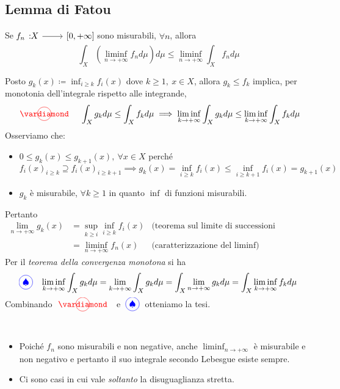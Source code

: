 \subsection{Lemma di Fatou}
\begin{lemming}
	Se $\funz{f_n}{X}{\left[0,+\infty\right]}$ sono misurabili, $\forall n$, allora
	\begin{equation}
		\int_X\left(\liminf_{n\to+\infty}f_nd\mu\right)d\mu\leq \liminf_{n\to+\infty}\int_Xf_nd\mu
	\end{equation}
\end{lemming}
\begin{demonstration}
	Posto $\displaystyle g_k(x)\coloneqq\inf_{i\geq k}f_i(x)$ dove $k\geq 1,\ x\in X$, allora $g_k\leq f_k$ implica, per monotonia dell'integrale rispetto alle integrande,
	\begin{equation*}
		\circled[red]{\vardiamond}\quad\int_Xg_kd\mu\leq \int_Xf_kd\mu\implies \liminf_{k\to+\infty}\int_Xg_kd\mu\leq \liminf_{k\to+\infty}\int_Xf_kd\mu
	\end{equation*}
Osserviamo che:
\begin{itemize}
	\item $0\leq g_k(x)\leq g_{k+1}(x),\ \forall x\in X$ perché
	\begin{equation*}
		f_i(x)_{i\geq k}\supseteq f_i(x)_{i\geq k+1}\implies g_k(x)=\inf_{i\geq k}f_i(x)\leq\inf_{i\geq k+1}f_i(x)=g_{k+1}(x)
	\end{equation*}
	\item $g_k$ è misurabile, $\forall k\geq 1$ in quanto $\inf$ di funzioni misurabili.
\end{itemize}
Pertanto
	\begin{align*}
	\lim_{n\to+\infty}g_k(x)&=\sup_{k\geq i}\inf_{i\geq k}f_i(x)&\text{(teorema sul limite di successioni monotone)}\\
	&=\liminf_{n\to+\infty}f_n(x)&\text{(caratterizzazione del $\liminf$)}
\end{align*}
Per il \textit{teorema della convergenza monotona} si ha
\begin{equation*}
	\circled[blue]{\spadesuit}\quad \liminf_{k\to+\infty}\int_Xg_kd\mu=\lim_{k\to+\infty}\int_Xg_kd\mu=\int_X\lim_{n\to+\infty}g_kd\mu=\int_X\liminf_{k\to+\infty}f_kd\mu
\end{equation*}
Combinando $\circled[red]{\vardiamond}\ $ e $\ \circled[blue]{\spadesuit}\ $ otteniamo la tesi.
\end{demonstration}
\begin{observe}~{}
	\begin{itemize}
		\item Poiché $f_n$ sono misurabili e non negative, anche $\liminf_{n\to+\infty}$ è misurabile e non negativo e pertanto il suo integrale secondo Lebesgue esiste sempre. 
		\item Ci sono casi in cui vale \textit{soltanto} la disuguaglianza stretta.
	\end{itemize}
\end{observe}
